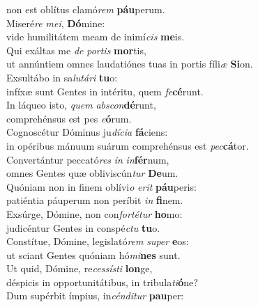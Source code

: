 \evenverse non est oblítus clamó\textit{rem} \textbf{páu}perum.\\
\oddverse Miseré\textit{re} \textit{me}\textit{i}, \textbf{Dó}mine:~\*\\
\oddverse vide humilitátem meam de inimí\textit{cis} \textbf{me}is.\\
\evenverse Qui exáltas me \textit{de} \textit{por}\textit{tis} \textbf{mor}tis,~\*\\
\evenverse ut annúntiem omnes laudatiónes tuas in portis fíli\textit{æ} \textbf{Si}on.\\
\oddverse Exsultábo in sa\textit{lu}\textit{tá}\textit{ri} \textbf{tu}o:~\*\\
\oddverse infíxæ sunt Gentes in intéritu, quem \textit{fe}\textbf{cé}runt.\\
\evenverse In láqueo isto, \textit{quem} \textit{ab}\textit{scon}\textbf{dé}runt,~\*\\
\evenverse comprehénsus est pes \textit{e}\textbf{ó}rum.\\
\oddverse Cognoscétur Dóminus ju\textit{dí}\textit{ci}\textit{a} \textbf{fá}ciens:~\*\\
\oddverse in opéribus mánuum suárum comprehénsus est \textit{pec}\textbf{cá}tor.\\
\evenverse Convertántur peccató\textit{res} \textit{in} \textit{in}\textbf{fér}num,~\*\\
\evenverse omnes Gentes quæ obliviscún\textit{tur} \textbf{De}um.\\
\oddverse Quóniam non in finem oblívi\textit{o} \textit{e}\textit{rit} \textbf{páu}peris:~\*\\
\oddverse patiéntia páuperum non períbit \textit{in} \textbf{fi}nem.\\
\evenverse Exsúrge, Dómine, non con\textit{for}\textit{té}\textit{tur} \textbf{ho}mo:~\*\\
\evenverse judicéntur Gentes in conspé\textit{ctu} \textbf{tu}o.\\
\oddverse Constítue, Dómine, legislató\textit{rem} \textit{su}\textit{per} \textbf{e}os:~\*\\
\oddverse ut sciant Gentes quóniam hó\textit{mi}\textbf{nes} sunt.\\
\evenverse Ut quid, Dómine, re\textit{ces}\textit{sí}\textit{sti} \textbf{lon}ge,~\*\\
\evenverse déspicis in opportunitátibus, in tribula\textit{ti}\textbf{ó}ne?\\
\oddverse Dum supérbit ímpius, in\textit{cén}\textit{di}\textit{tur} \textbf{pau}per:~\*\\
